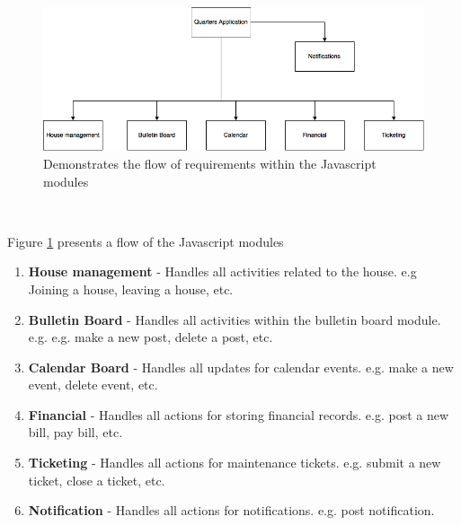 \documentclass[12pt]{article}
\begin{document}
\begin{figure}
\centering
\includegraphics[width=\textwidth]{quarters}
\caption{Demonstrates the flow of requirements within the Javascript modules}
\label{fig:jsflow}
\end{figure}

\

 Figure \ref{fig:jsflow} presents a flow of the Javascript modules
\begin{enumerate}
    \item \textbf{House management} - Handles all activities related to the house. e.g Joining a house, leaving a house, etc.
    \item \textbf{Bulletin Board} - Handles all activities within the bulletin board module. e.g. e.g. make a new post, delete a post, etc.
    \item \textbf{Calendar Board} - Handles all updates  for calendar events. e.g. make a new event, delete event, etc.
    \item \textbf{Financial} - Handles all actions for storing financial records. e.g. post a new bill, pay bill, etc.
    \item \textbf{Ticketing} - Handles all actions for maintenance tickets. e.g. submit a new ticket, close a ticket, etc.
    \item \textbf{Notification} - Handles all actions for notifications. e.g. post notification.
    
    
\end{enumerate}
\end{document}
